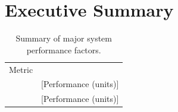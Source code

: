 \documentclass[report]{byu-aero}
\begin{document}


\setcounter{page}{2} %
\thispagestyle{tocpage} %
\tableofcontents %

\clearpage
\newpage

\section{Executive Summary} %
\label{sec:ExecutiveSummary}


\lipsum[1-6]

\begin{table}[h!]
	\centering
	\caption{Summary of major system performance factors.}
	\label{tab:performancesummary}
	\begin{tabular}{ c c } 

		\rowcolor{BYUbluemid}
		Metric & \\

		& {\color{\BYUred}[Performance (units)]} \\

		&  {\color{\BYUred} [Performance (units)]} \\

	\end{tabular}
\end{table}

\newpage

\end{document}
